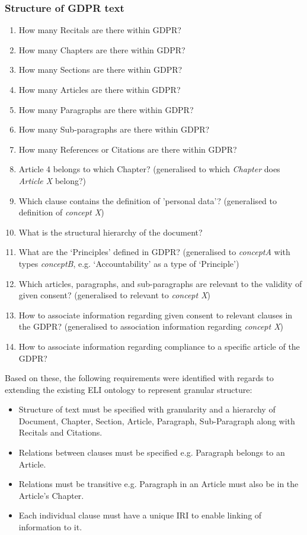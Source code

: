 \subsubsection{Structure of GDPR text}
\begin{enumerate}[label={\texttt{CQ.\theenumi}}]
    \item How many Recitals are there within GDPR?
    \item How many Chapters are there within GDPR?
    \item How many Sections are there within GDPR?
    \item How many Articles are there within GDPR?
    \item How many Paragraphs are there within GDPR?
    \item How many Sub-paragraphs are there within GDPR?
    \item How many References or Citations are there within GDPR?
    \item Article 4 belongs to which Chapter? (generalised to which \textit{Chapter} does \textit{Article X} belong?)
    \item Which clause contains the definition of 'personal data'? (generalised to definition of \textit{concept X})
    \item What is the structural hierarchy of the document?
    \item What are the `Principles' defined in GDPR? (generalised to \textit{conceptA} with types \textit{conceptB}, e.g. `Accountability' as a type of `Principle')
    \item Which articles, paragraphs, and sub-paragraphs are relevant to the validity of given consent? (generalised to relevant to \textit{concept X})
    \item How to associate information regarding given consent to relevant clauses in the GDPR? (generalised to association information regarding \textit{concept X})
    \item How to associate information regarding compliance to a specific article of the GDPR?
\end{enumerate}

Based on these, the following requirements were identified with regards to extending the existing ELI ontology to represent granular structure:
\begin{itemize}
    \item Structure of text must be specified with granularity and a hierarchy of Document, Chapter, Section, Article, Paragraph, Sub-Paragraph along with Recitals and Citations.
    \item Relations between clauses must be specified e.g. Paragraph belongs to an Article.
    \item Relations must be transitive e.g. Paragraph in an Article must also be in the Article's Chapter.
    \item Each individual clause must have a unique IRI to enable linking of information to it.
\end{itemize}

